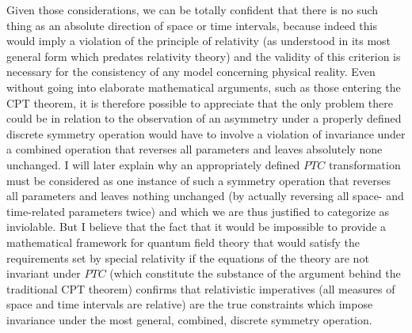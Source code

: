 \documentclass[notitlepage,12pt]{report}
\begin{document}
Given those considerations, we can be totally confident that there is no such thing as an absolute direction of space or time intervals, because indeed this would imply a violation of the principle of relativity (as understood in its most general form which predates relativity theory) and the validity of this criterion is necessary for the consistency of any model concerning physical reality. Even without going into elaborate mathematical arguments, such as those entering the CPT theorem, it is therefore possible to appreciate that the only problem there could be in relation to the observation of an asymmetry under a properly defined discrete symmetry operation would have to involve a violation of invariance under a combined operation that reverses all parameters and leaves absolutely none unchanged. I will later explain why an appropriately defined $PTC$ transformation must be considered as one instance of such a symmetry operation that reverses all parameters and leaves nothing unchanged (by actually reversing all space- and time-related parameters twice) and which we are thus justified to categorize as inviolable. But I believe that the fact that it would be impossible to provide a mathematical framework for quantum field theory that would satisfy the requirements set by special relativity if the equations of the theory are not invariant under $PTC$ (which constitute the substance of the argument behind the traditional CPT theorem) confirms that relativistic imperatives (all measures of space and time intervals are relative) are the true constraints which impose invariance under the most general, combined, discrete symmetry operation.
\end{document}
